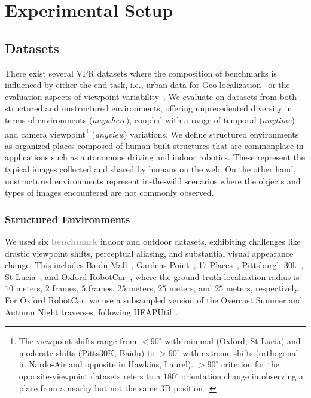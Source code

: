 \documentclass[letterpaper, 10 pt, conference]{ieeeconf}  \fi
\newcommand{\highlight}[1]{\textcolor{darkgray}{\textbf{#1}}}
\begin{document}
 
\section{Experimental Setup}
\label{sec:setup}

\subsection{Datasets}
\label{sec:datasets}

There exist several VPR datasets where the composition of benchmarks is influenced by either the end task, i.e., urban data for Geo-localization~\cite{berton2022deep} or the evaluation aspects of viewpoint variability~\cite{zaffar2021vpr}. 
We evaluate on datasets from both structured and unstructured environments, 
offering unprecedented diversity in terms of environments (\emph{anywhere}), coupled with a range of temporal (\emph{anytime}) and camera viewpoint\footnote{The viewpoint shifts range from $<90^\circ$ with minimal (Oxford, St Lucia) and moderate shifts (Pitts30K, Baidu) to $>90^\circ$ with extreme shifts (orthogonal in Nardo-Air and opposite in Hawkins, Laurel). $>90^\circ$ criterion for the opposite-viewpoint datasets refers to a $180^\circ$ orientation change in observing a place from a nearby but not the same 3D position~\cite{garg2018lost,garg2021your}.} (\emph{anyview}) variations.
We define structured environments as organized places composed of human-built structures that are commonplace in applications such as autonomous driving and indoor robotics. 
These represent the typical images collected and shared by humans on the web.
On the other hand, unstructured environments represent in-the-wild scenarios where the objects and types of images encountered are not commonly observed.

\subsubsection{Structured Environments}
\label{sec:structured_envs}

We used six \highlight{benchmark} indoor and outdoor datasets, exhibiting challenges like drastic viewpoint shifts, perceptual aliasing, and substantial visual appearance change. 
This includes Baidu Mall~\cite{sun2017baidu}, Gardens Point~\cite{glover2014gardens, sunderhauf2015performance}, 17 Places~\cite{sahdev2016indoor}, Pittsburgh-30k~\cite{torii2013visual}, St Lucia~\cite{warren2010unaided}, and Oxford RobotCar~\cite{maddern20171}, where the ground truth localization radius is $10$ meters, $2$ frames, $5$ frames, $25$ meters, $25$ meters, and $25$ meters, respectively. 
For Oxford RobotCar, we use a subsampled version of the Overcast Summer and Autumn Night traverses, following HEAPUtil~\cite{keetha2021hierarchical}.
\end{document}
